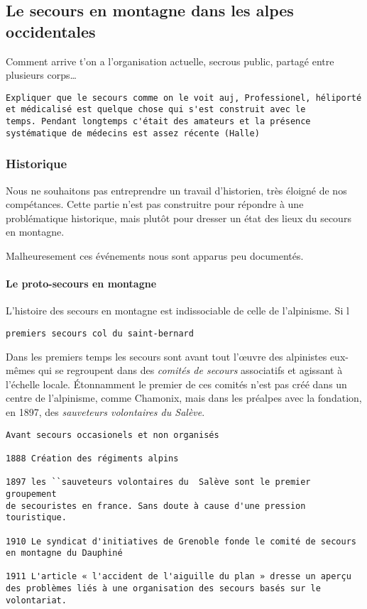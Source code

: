\subsection{Le secours en montagne dans les alpes occidentales}
\label{subsec:1-1-1}

Comment arrive t'on a l'organisation actuelle, secrous public, partagé
entre plusieurs corps…


\begin{verbatim}
Expliquer que le secours comme on le voit auj, Professionel, héliporté
et médicalisé est quelque chose qui s'est construit avec le
temps. Pendant longtemps c'était des amateurs et la présence
systématique de médecins est assez récente (Halle)
\end{verbatim}

\subsubsection{Historique}
\label{subsubsec:1-1-1-1}

Nous ne souhaitons pas entreprendre un travail d'historien, très
éloigné de nos compétances. Cette partie n'est pas construitre pour
répondre à une problématique historique, mais plutôt pour dresser un
état des lieux du secours en montagne.

Malheuresement ces événements nous sont apparus peu documentés.

\paragraph{Le proto-secours en montagne}
\label{par:1-1-1-1-1}

L'histoire des secours en montagne est indissociable de celle de
l'alpinisme. Si l

\begin{verbatim}
premiers secours col du saint-bernard
\end{verbatim}


Dans les premiers temps les secours sont avant tout l’œuvre des
alpinistes eux-mêmes qui se regroupent dans des \emph{comités de
  secours} associatifs et agissant à l'échelle locale. Étonnamment le
premier de ces comités n'est pas créé dans un centre de l'alpinisme,
comme Chamonix, mais dans les préalpes avec la fondation, en 1897, des
\emph{sauveteurs volontaires du Salève}.

\begin{verbatim}
Avant secours occasionels et non organisés

1888 Création des régiments alpins

1897 les ``sauveteurs volontaires du  Salève sont le premier groupement
de secouristes en france. Sans doute à cause d'une pression touristique.

1910 Le syndicat d'initiatives de Grenoble fonde le comité de secours
en montagne du Dauphiné

1911 L'article « l'accident de l'aiguille du plan » dresse un aperçu
des problèmes liés à une organisation des secours basés sur le
volontariat.
\end{verbatim}

